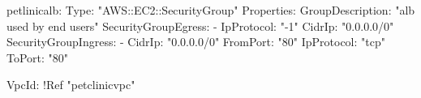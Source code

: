 petlinicalb:
    Type: "AWS::EC2::SecurityGroup"
    Properties:
      GroupDescription: "alb used by end users"
      SecurityGroupEgress:
      - IpProtocol: "-1"
        CidrIp: "0.0.0.0/0"
      SecurityGroupIngress:
      - CidrIp: "0.0.0.0/0"
        FromPort: "80"
        IpProtocol: "tcp"
        ToPort: "80"
     
      VpcId: !Ref "petclinicvpc"